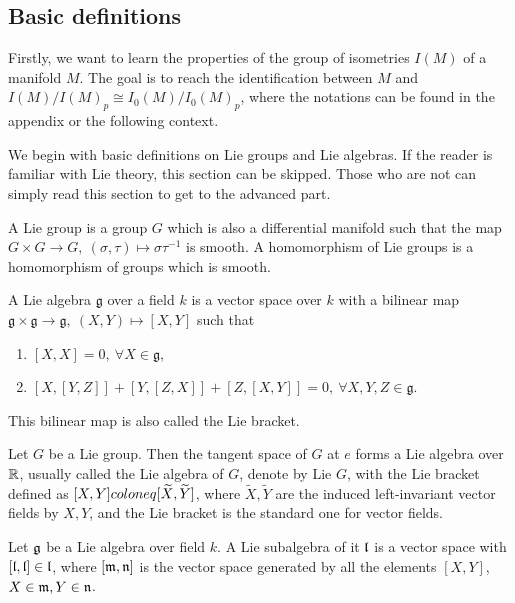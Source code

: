\subsection{Basic definitions}

Firstly, we want to learn the properties of the group of
isometries $I(M)$ of a manifold $M$. The goal is to reach the
identification between $M$ and $I(M)/I(M)_p\cong
I_0(M)/I_0(M)_p$, where the notations can be found in the
appendix or the following context.

We begin with basic definitions on Lie groups and Lie algebras.
If the reader is familiar with Lie theory, this section can be
skipped. Those who are not can simply read this section to get to
the advanced part.
\begin{definition}
	A Lie group is a group $G$ which is also a differential
	manifold such that the map $G\times G\to G,\
	(\sigma, \tau)\mapsto \sigma\tau^{-1}$ is smooth. A
	homomorphism of Lie groups is a homomorphism of groups which
	is smooth.
\end{definition}

\begin{definition}
	A Lie algebra $\mathfrak{g}$ over a field $k$ is a vector
	space over $k$  with a bilinear map
	$\mathfrak{g}\times\mathfrak{g}\to \mathfrak{g},\
	(X, Y)\mapsto [X, Y]$  such that
	
  \begin{enumerate}
    \item $[X,X]=0,\ \forall X\in \mathfrak{g} $,
    
    \item $[X, [Y, Z]]+[Y, [Z, X]]+[Z, [X, Y]]=0,\ \forall X, Y, Z\in \mathfrak{g}$.
  \end{enumerate}
	
	This bilinear map is also called the Lie bracket.
\end{definition}

\begin{theorem}
	Let $G$ be a Lie group. Then the tangent space of $G$ at $e$
	forms a Lie algebra over $\bbR$, usually called the Lie algebra
	of $G$, denote by Lie $G$, with the Lie bracket defined as
	$[X,Y]\\coloneq [\tilde X, \tilde Y]$, where $\tilde X, \tilde Y$ are
	the induced left-invariant vector fields by $X, Y$, and the
	Lie bracket is the standard one for vector fields.
\end{theorem}

\begin{definition}
	Let $\ssg$ be a Lie algebra over field $k$. A Lie subalgebra
	of it $\ssl$ is a vector space  with $[\ssl, \ssl]\in \ssl$,
	where $[\ssm, \ssn]$ is the vector space generated by all the
	elements $[X, Y]$, $X\in \ssm, Y\in \ssn$.
\end{definition}

